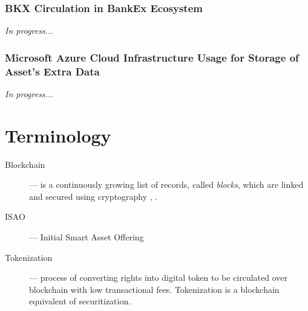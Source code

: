 \documentclass{article}
\begin{document}
\begin{multicols}{2}
\subsubsection{BKX Circulation in BankEx Ecosystem}

\textit{In progress...}

\subsubsection{Microsoft Azure Cloud Infrastructure Usage for Storage of Asset's Extra Data}

\textit{In progress...}

\end{multicols}

\newpage
\appendix

\section{Terminology}
\begin{description}
\item[Blockchain]--- is a continuously growing list of records, called \textit{blocks}, which are linked and secured using cryptography \cite{bitcoinComprehensive2016}, \cite{wikipediaBlockchain}.
\item[ISAO]--- Initial Smart Asset Offering
\item[Tokenization]--- process of converting rights into digital token to be circulated over blockchain with low transactional fees. Tokenization is a blockchain equivalent of securitization.
\end{description}

\printbibliography
\end{document}
